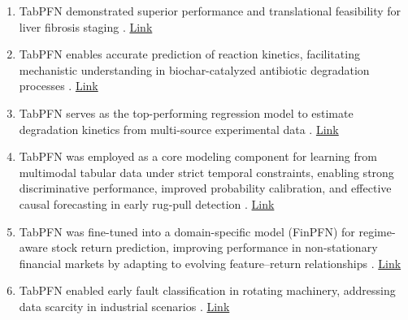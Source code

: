\begin{enumerate}
\item TabPFN demonstrated superior performance and translational feasibility for liver fibrosis staging \cite{CHEN2026102726}. \href{https://www.cell.com/cell-reports-medicine/fulltext/S2666-3791(26)00143-6}{Link}

\item TabPFN enables accurate prediction of reaction kinetics, facilitating mechanistic understanding in biochar-catalyzed antibiotic degradation processes \cite{latif2026deep}. \href{https://link.springer.com/article/10.1007/s42773-026-00606-y}{Link}


\item TabPFN serves as the top-performing regression model to estimate degradation kinetics from multi-source experimental data \cite{latif2026deep}. \href{https://doi.org/10.1007/s42773-026-00606-y}{Link}

\item TabPFN was employed as a core modeling component for learning from multimodal tabular data under strict temporal constraints, enabling strong discriminative performance, improved probability calibration, and effective causal forecasting in early rug-pull detection \cite{shoaei2026lroo}. \href{http://arxiv.org/abs/2603.11324v1}{Link}

\item TabPFN was fine-tuned into a domain-specific model (FinPFN) for regime-aware stock return prediction, improving performance in non-stationary financial markets by adapting to evolving feature--return relationships \cite{wang2025metalearning}. \href{https://www.sciencedirect.com/science/article/abs/pii/S1386418125000825}{Link}

\item TabPFN enabled early fault classification in rotating machinery, addressing data scarcity in industrial scenarios \cite{manuf_usecase1_rotating_faults_tabpfn}. \href{https://ieeexplore.ieee.org/abstract/document/10318062}{Link}

\end{enumerate}





